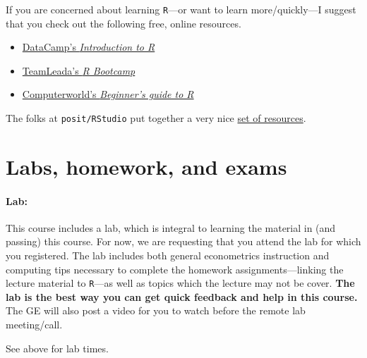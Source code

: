 \documentclass[10pt]{article}
\begin{document}
If you are concerned about learning \texttt{R}---or want to learn more/quickly---I suggest that you check out the following free, online resources.
\begin{itemize}
  \item \href{https://www.datacamp.com/courses/free-introduction-to-r}{DataCamp's \textit{Introduction to R}}
  \item \href{https://www.teamleada.com/courses/r-bootcamp}{TeamLeada's \textit{R Bootcamp}}
  \item \href{https://www.computerworld.com/article/2497143/business-intelligence-beginner-s-guide-to-r-introduction.html}{Computerworld's \textit{Beginner's guide to R}}
\end{itemize}
The folks at \texttt{posit/RStudio} put together a very nice \href{https://education.rstudio.com/learn/beginner/}{set of resources}.

\section*{Labs, homework, and exams}

\paragraph{Lab:} This course includes a lab, which is integral to learning the material in (and passing) this course. For now, we are requesting that you attend the lab for which you registered. The lab includes both general econometrics instruction and computing tips necessary to complete the homework assignments---linking the lecture material to \texttt{R}---as well as topics which the lecture may not be cover. \textbf{The lab is the best way you can get quick feedback and help in this course.} The GE will also post a video for you to watch before the remote lab meeting/call.

See above for lab times.
\end{document}
